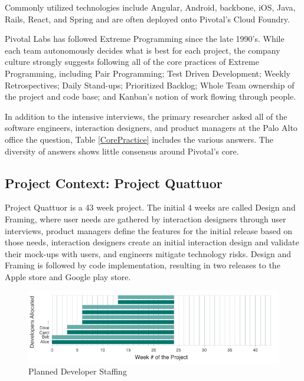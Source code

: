 Commonly utilized technologies include Angular, Android, backbone, iOS, Java, Rails, React, and Spring and are often deployed onto Pivotal's Cloud Foundry. 

Pivotal Labs has followed Extreme Programming \cite{ExtremeProgramming2004} since the late 1990's. While each team autonomously decides what is best for each project, the company culture strongly suggests following all of the core practices of Extreme Programming, including Pair Programming; Test Driven Development; Weekly Retrospectives; Daily Stand-ups; Prioritized Backlog; Whole Team ownership of the project and code base; and Kanban's notion of work flowing through people.

In addition to the intensive interviews, the primary researcher asked all of the software engineers, interaction designers, and product managers at the Palo Alto office the question,  Table \ref{CorePractice} includes the various answers. The diversity of answers shows little consensus around Pivotal's core. 

\subsection{Project Context: Project Quattuor}
\label{ExampleInAction}
Project Quattuor is a 43 week project. The initial 4 weeks are called Design and Framing, where user needs are gathered by interaction designers through user interviews, product managers define the features for the initial release based on those needs, interaction designers create an initial interaction design and validate their mock-ups with users, and engineers mitigate technology risks. Design and Framing is followed by code implementation, resulting in two releases to the Apple store and Google play store.

\begin{figure}[t]
\centering
\includegraphics[width=7.1in]{OriginalDeveloperStaffingV2.jpg}
\caption{Planned Developer Staffing}
\label{PlannedDeveloperStaffing}
\end{figure}

